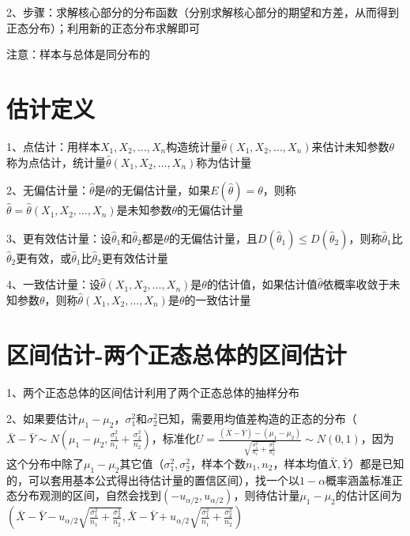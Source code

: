 2、步骤：求解核心部分的分布函数（分别求解核心部分的期望和方差，从而得到正态分布）；利用新的正态分布求解即可

注意：样本与总体是同分布的

\section{估计定义}

1、点估计：用样本$X_1,X_2,\ldots,X_n$构造统计量$\hat \theta(X_1,X_2,\ldots,X_n)$来估计未知参数$\theta$称为点估计，统计量$\hat \theta(X_1,X_2,\ldots,X_n)$称为估计量

2、无偏估计量：$\hat \theta$是$\theta$的无偏估计量，如果$E(\hat \theta)=\theta$，则称$\hat \theta=\hat \theta(X_1,X_2,\ldots,X_n)$是未知参数$\theta$的无偏估计量

3、更有效估计量：设$\hat \theta_1$和$\hat \theta_2$都是$\theta$的无偏估计量，且$D(\hat \theta_1) \le D(\hat \theta_2)$，则称$\hat \theta_1$比$\hat \theta_2$更有效，或$\hat \theta_1$比$\hat \theta_2$更有效估计量

4、一致估计量：设$\hat \theta(X_1,X_2,\ldots,X_n)$是$\theta$的估计值，如果估计值$\hat \theta$依概率收敛于未知参数$\theta$，则称$\hat \theta(X_1,X_2,\ldots,X_n)$是$\theta$的一致估计量

\section{区间估计-两个正态总体的区间估计}

1、两个正态总体的区间估计利用了两个正态总体的抽样分布

2、如果要估计$\mu_1-\mu_2$，$\sigma_{1}^{2}$和$\sigma_{2}^{2}$已知，需要用均值差构造的正态的分布（$\bar{X}-\bar{Y} \sim N\left(\mu_{1}-\mu_{2}, \frac{\sigma_{1}^{2}}{n_{1}}+\frac{\sigma_{2}^{2}}{n_{2}}\right)$，标准化$ U=\frac{(\bar{X}-\bar{Y})-\left(\mu_{1}-\mu_{2}\right)}{\sqrt{\frac{\sigma_{1}^{2}}{n_{1}}+\frac{\sigma_{2}^{2}}{n_{2}}}} \sim N(0,1)$，因为这个分布中除了$\mu_{1}-\mu_{2}$其它值（$\sigma_{1}^{2},\sigma_{2}^{2}$，样本个数$n_1,n_2$，样本均值$\bar{X},\bar{Y}$）都是已知的，可以套用基本公式得出待估计量的置信区间），找一个以$1−α$概率涵盖标准正态分布观测的区间，自然会找到$(−u_{\alpha/2},u_{\alpha/2})$，则待估计量$\mu_1-\mu_2$的估计区间为$ \left(\bar{X}-\bar{Y}-u_{{\alpha}/{2}} \sqrt{\frac{\sigma_{1}^{2}}{n_{1}}+\frac{\sigma_{2}^{2}}{n_{2}}}, \bar{X}-\bar{Y}+u_{{\alpha}/{2}} \sqrt{\frac{\sigma_{1}^{2}}{n_{1}}+\frac{\sigma_{2}^{2}}{n_{2}}}\right)$

